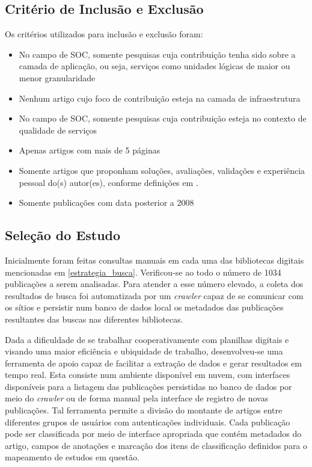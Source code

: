 \subsection{Crit\'{e}rio de Inclusão e Exclusão}

Os critérios utilizados para inclusão e exclusão foram:

\begin{itemize}
\item No campo de SOC, somente pesquisas cuja contribuição tenha sido sobre a camada de aplicação, ou seja, serviços como unidades 
lógicas de maior ou menor granularidade
\item Nenhum artigo cujo foco de contribuição esteja na camada de infraestrutura
\item No campo de SOC, somente pesquisas cuja contribuição esteja no contexto de qualidade de serviços
\item Apenas artigos com mais de 5 páginas
\item Somente artigos que proponham soluções, avaliações, validações e experiência pessoal do(s) autor(es), conforme definições em \cite{Barbara Kitchenham}.
\item Somente publicações com data posterior a 2008
\end{itemize}

\subsection{Seleção do Estudo}

Inicialmente foram feitas consultas manuais em cada uma das bibliotecas digitais mencionadas em \ref{estrategia_busca}. Verificou-se ao todo o número de 1034 publicações a serem analisadas. Para atender a esse número elevado, a coleta dos resultados de busca foi automatizada por um \emph{crawler} capaz de se comunicar com os sítios e persistir num banco de dados local os metadados das publicações resultantes das buscas nas diferentes bibliotecas.

Dada a dificuldade de se trabalhar cooperativamente com planilhas digitais e visando uma maior eficiência e ubiquidade de trabalho, desenvolveu-se uma ferramenta de apoio capaz de facilitar a extração de dados e gerar resultados em tempo real. Esta consiste num ambiente disponível em nuvem, com interfaces disponíveis para a listagem das publicações persistidas no banco de dados por meio do \emph{crawler} ou de forma manual pela interface de registro de novas publicações. Tal ferramenta permite a divisão do montante de artigos entre diferentes grupos de usuários com autenticações individuais. Cada publicação pode ser classificada por meio de interface apropriada que contém metadados do artigo, campos de anotações e marcação dos itens de classificação definidos para o mapeamento de estudos em questão.  

